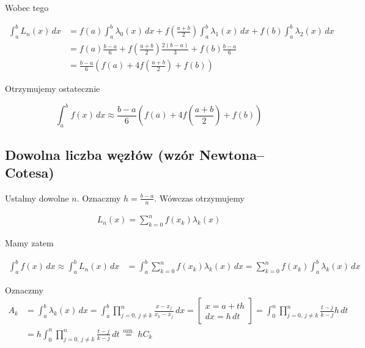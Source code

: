 \documentclass{article}
\theoremstyle{definition}
\begin{document}
\noindent Wobec tego 

\begin{align*}
    \int_a^b L_n(x) \,dx &= 
    f(a)\int_a^b \lambda_0(x) \,dx 
    + f\left( \frac{a+b}{2} \right) \int_a^b \lambda_1(x) \,dx 
    + f(b) \int_a^b \lambda_2(x) \,dx \\
    &= f(a) \frac{b-a}{6} + f\left( \frac{a+b}{2} \right) \frac{2(b-a)}{3} + f(b) \frac{b-a}{6} \\
    &= \frac{b-a}{6} \left( f(a) + 4f\left( \frac{a+b}{2} \right) + f(b) \right)
\end{align*}

\noindent Otrzymujemy ostatecznie

\begin{equation}\tag{WSimp}
    \label{wzor_Simpsona}
    \int_a^b f(x) \,dx \approx  \frac{b-a}{6} \left( f(a) + 4f\left( \frac{a+b}{2} \right) + f(b) \right)
\end{equation}


\subsection{Dowolna liczba węzłów (wzór Newtona--Cotesa)}

Ustalmy dowolne \(n\). Oznaczmy \(h = \frac{b-a}{n}\). Wówczas otrzymujemy

\begin{align*}
    L_n(x) = \sum_{k=0}^{n} f(x_k)\lambda_k(x)
\end{align*}

\noindent Mamy zatem 

\begin{align}
    \tag{*} \label{wzor:calka}
    \int_a^b f(x) \,dx \approx \int_a^b L_n(x) \,dx &= \int_a^b \sum_{k=0}^{n} f(x_k)\lambda_k(x) \,dx 
    = \sum_{k=0}^{n} f(x_k) \int_a^b \lambda_k(x) \,dx 
\end{align}

\noindent Oznaczmy
\begin{align*}
    A_k &= \int_a^b \lambda_k(x) \,dx  
    = \int_a^b \prod_{j=0, \, j \neq k}^{n} \frac{x-x_j}{x_k - x_j} \,dx
    = \begin{bmatrix}
        x = a + th \\
        dx = h \,dt 
    \end{bmatrix}
    =
    \int_0^n  \prod_{j=0, \, j \neq k}^{n} \frac{t - j}{k - j} h\,dt \\
    &= h \int_0^n  \prod_{j=0, \, j \neq k}^{n} \frac{t - j}{k - j} \,dt
    \, \stackrel{\text{ozn.}}{=} \, h C_k
\end{align*}
\end{document}
